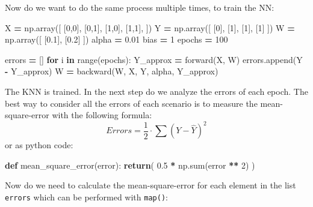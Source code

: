 \documentclass[
]{book}
\newenvironment{Shaded}{\begin{snugshade}}{\end{snugshade}}
\newcommand{\BuiltInTok}[1]{#1}
\newcommand{\ControlFlowTok}[1]{\textcolor[rgb]{0.13,0.29,0.53}{\textbf{#1}}}
\newcommand{\DecValTok}[1]{\textcolor[rgb]{0.00,0.00,0.81}{#1}}
\newcommand{\FloatTok}[1]{\textcolor[rgb]{0.00,0.00,0.81}{#1}}
\newcommand{\KeywordTok}[1]{\textcolor[rgb]{0.13,0.29,0.53}{\textbf{#1}}}
\newcommand{\NormalTok}[1]{#1}
\newcommand{\OperatorTok}[1]{\textcolor[rgb]{0.81,0.36,0.00}{\textbf{#1}}}
\begin{document}
Now do we want to do the same process multiple times, to train the NN:

\begin{Shaded}
\begin{Highlighting}[]
\NormalTok{X }\OperatorTok{=}\NormalTok{ np.array([}
\NormalTok{  [}\DecValTok{0}\NormalTok{,}\DecValTok{0}\NormalTok{],}
\NormalTok{  [}\DecValTok{0}\NormalTok{,}\DecValTok{1}\NormalTok{],}
\NormalTok{  [}\DecValTok{1}\NormalTok{,}\DecValTok{0}\NormalTok{],}
\NormalTok{  [}\DecValTok{1}\NormalTok{,}\DecValTok{1}\NormalTok{],}
\NormalTok{])}
\NormalTok{Y }\OperatorTok{=}\NormalTok{ np.array([}
\NormalTok{  [}\DecValTok{0}\NormalTok{],}
\NormalTok{  [}\DecValTok{1}\NormalTok{],}
\NormalTok{  [}\DecValTok{1}\NormalTok{],}
\NormalTok{  [}\DecValTok{1}\NormalTok{]}
\NormalTok{])}
\NormalTok{W }\OperatorTok{=}\NormalTok{ np.array([}
\NormalTok{  [}\FloatTok{0.1}\NormalTok{], }
\NormalTok{  [}\FloatTok{0.2}\NormalTok{]}
\NormalTok{])}
\NormalTok{alpha }\OperatorTok{=} \FloatTok{0.01}
\NormalTok{bias }\OperatorTok{=} \DecValTok{1}
\NormalTok{epochs }\OperatorTok{=} \DecValTok{100}

\NormalTok{errors }\OperatorTok{=}\NormalTok{ []}
\ControlFlowTok{for}\NormalTok{ i }\KeywordTok{in} \BuiltInTok{range}\NormalTok{(epochs):}
\NormalTok{  Y\_approx }\OperatorTok{=}\NormalTok{ forward(X, W)}
\NormalTok{  errors.append(Y }\OperatorTok{{-}}\NormalTok{ Y\_approx)}
\NormalTok{  W }\OperatorTok{=}\NormalTok{ backward(W, X, Y, alpha, Y\_approx)}
\end{Highlighting}
\end{Shaded}

The KNN is trained. In the next step do we analyze the errors of each epoch. The best way to consider all the errors of each scenario is to measure the mean-square-error with the following formula:
\[
  Errors = \frac{1}{2} \cdot \sum(Y-\hat{Y})^2
\]
or as python code:

\begin{Shaded}
\begin{Highlighting}[]
\KeywordTok{def}\NormalTok{ mean\_square\_error(error):}
  \ControlFlowTok{return}\NormalTok{( }\FloatTok{0.5} \OperatorTok{*}\NormalTok{ np.}\BuiltInTok{sum}\NormalTok{(error }\OperatorTok{**} \DecValTok{2}\NormalTok{) )}
\end{Highlighting}
\end{Shaded}

Now do we need to calculate the mean-square-error for each element in the list \texttt{errors} which can be performed with \texttt{map()}:
\end{document}
